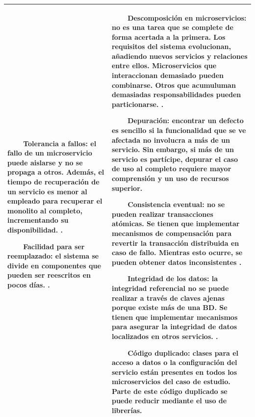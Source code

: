 \documentclass[11pt,spanish,listoffigures]{tfgetsinf}
\newcommand{\tabitem}{~~\llap{\textbullet}~~}
\begin{document}
\begin{center}
\begin{tabular}{|p{7.1cm}|p{7.1cm}|}
\vspace{2mm}
\tabitem \textbf{Tolerancia a fallos}: el fallo de un microservicio puede aislarse y no se propaga a otros. Además, el tiempo de recuperación de un servicio es menor al empleado para recuperar el monolito al completo, incrementando su disponibilidad. \cite{Newman2015a, Lewis2014, DelaTorre2018}.

\vspace{2mm}
\tabitem \textbf{Facilidad para ser reemplazado}: el sistema se divide en componentes que pueden ser reescritos en pocos días. \cite{Newman2015a, Lewis2014}.

&

\vspace{0.25mm}
\tabitem \textbf{Descomposición en microservicios}: no es una tarea que se complete de forma acertada a la primera. Los requisitos del sistema evolucionan, añadiendo nuevos servicios y  relaciones entre ellos. Microservicios que interaccionan demasiado pueden combinarse. Otros que acumuluman demasiadas responsabilidades pueden particionarse. \cite{Newman2015a, Lewis2014, DelaTorre2018}.

\vspace{2mm}
\tabitem \textbf{Depuración}: encontrar un defecto es sencillo si la funcionalidad que se ve afectada no involucra a más de un servicio. Sin embargo, si más de un servicio es partícipe, depurar el caso de uso al completo requiere mayor comprensión y un uso de recursos superior. \cite{Newman2015a}

\vspace{2mm}
\tabitem \textbf{Consistencia eventual}: no se pueden realizar transacciones atómicas. Se tienen que implementar mecanismos de compensación para revertir la transacción distribuida en caso de fallo. Mientras esto ocurre, se pueden obtener datos inconsistentes \cite{Newman2015a, DelaTorre2018, Lewis2014}.

\vspace{2mm}
\tabitem \textbf{Integridad de los datos}: la integridad referencial no se puede realizar a través de claves ajenas porque existe más de una BD. Se tienen que implementar mecanismos para asegurar la integridad de datos localizados en otros servicios. \cite{Newman2015a, DelaTorre2018}.

\vspace{2mm}
\tabitem \textbf{Código duplicado}: clases para el acceso a datos o la configuración del servicio están presentes en todos los microservicios del caso de estudio. Parte de este código duplicado se puede reducir mediante el uso de librerías.

\\
\hline

\end{tabular}
\end{center}
\end{document}
